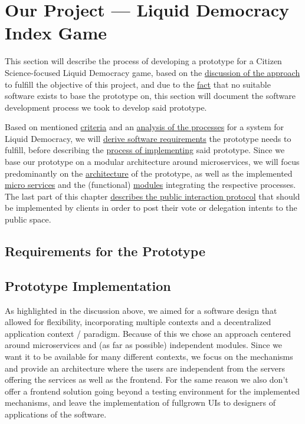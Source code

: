 \chapter{Our Project — Liquid Democracy Index Game}
\label{ch:Our_Project}


This section will describe the process of developing a prototype for a Citizen Science-focused Liquid Democracy game, based on the \href{sec:Approach}{discussion of the approach} to fulfill the objective of this project, and due to the \href{sec:DiscussionRW}{fact} that no suitable software exists to base the prototype on, this section will document the software development process we took to develop said prototype.

Based on mentioned \href{sec:Criteria}{criteria} and an \href{sec:AnalysisProcesses}{analysis of the processes} for a system for Liquid Democracy, we will \href{sec:SoftwareRequirements}{derive software requirements} the prototype needs to fulfill, before describing the \href{sec:Implementation}{process of implementing} said prototype. Since we base our prototype on a modular architecture around microservices, we will focus predominantly on the \href{ssec:Architecture}{architecture} of the prototype, as well as the implemented \href{ssec:Microservices}{micro services} and the (functional) \href{ssec:Modules}{modules} integrating the respective processes. The last part of this chapter \href{ssec:VotingProtocol}{describes the public interaction protocol} that should be implemented by clients in order to post their vote or delegation intents to the public space.

\section{Requirements for the Prototype}
\label{sec:SoftwareRequirements}
\section{Prototype Implementation}
\label{sec:Implementation}

As highlighted in the discussion above, we aimed for a software design that allowed for flexibility, incorporating multiple contexts and a decentralized application context / paradigm. Because of this we chose an approach centered around microservices and (as far as possible) independent modules. Since we want it to be available for many different contexts, we focus on the mechanisms and provide an architecture where the users are independent from the servers offering the services as well as the frontend. For the same reason we also don't offer a frontend solution going beyond a testing environment for the implemented mechanisms, and leave the implementation of fullgrown UIs to designers of applications of the software.

